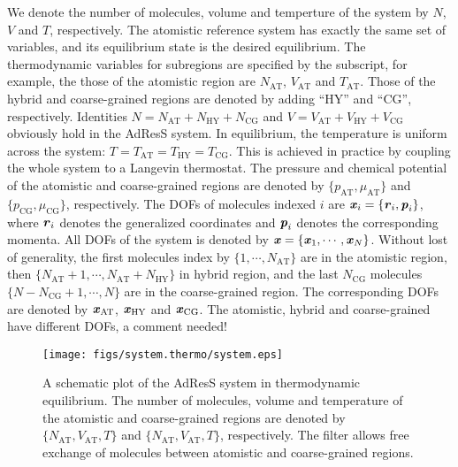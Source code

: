 \documentclass[epjST]{svjour}
\newcommand{\redc}[1]{{\color{red} #1}}
\newcommand{\vect}[1]{\textbf{\textit{#1}}}
\newcommand{\AT}[0]{\textrm{AT}}
\newcommand{\HY}[0]{\textrm{HY}}
\newcommand{\CG}[0]{\textrm{CG}}
\newcommand{\moleidxone}[0]{i}
\begin{document}
We denote the number of molecules, volume and temperture of the system by $N$, $V$ and $T$, respectively.
The atomistic reference system has exactly the same set of variables, and its equilibrium state  is
the desired equilibrium.
The thermodynamic variables for subregions are specified by the subscript,
for example, the those of the atomistic region are 
$N_\AT$, $V_\AT$ and $T_\AT$. Those of the hybrid and coarse-grained regions
are denoted by adding ``$\HY$'' and ``$\CG$'', respectively.
Identities $N = N_\AT + N_\HY + N_\CG$ and $V = V_\AT + V_\HY + V_\CG$ obviously hold
in the AdResS system.
In equilibrium, the temperature is uniform across the system: $T = T_\AT = T_\HY = T_\CG$.
This is achieved in practice by coupling the whole system to a Langevin thermostat.
The pressure and chemical potential of the atomistic and coarse-grained regions
are denoted by $\{p_\AT, \mu_\AT\}$
and $\{p_\CG, \mu_\CG\}$, respectively.
The DOFs of molecules indexed $\moleidxone$ are $\vect x_\moleidxone = \{\vect r_\moleidxone, \vect p_\moleidxone\}$, where
$\vect r_\moleidxone$ denotes the generalized coordinates and $\vect p_\moleidxone$ denotes the corresponding momenta.
All DOFs of the system is denoted by $\vect x = \{\vect x_1, \cdots, \vect x_N\}$. Without lost of
generality, the first molecules index by $\{1, \cdots, N_\AT\}$ are in the atomistic region, then $\{N_\AT+1, \cdots, N_\AT + N_\HY\}$ in hybrid region, and
the last $N_\CG$ molecules $\{N-N_\CG+1, \cdots, N\}$ are in the coarse-grained region. The corresponding DOFs are denoted by $\vect x_\AT$, $\vect x_\HY$ and $\vect x_\CG$.
\redc{The atomistic, hybrid and coarse-grained have different DOFs, a comment needed!}

\begin{figure}
  \centering
  \texttt{[image: figs/system.thermo/system.eps]}
  \caption{A schematic plot of the AdResS system in thermodynamic
    equilibrium. The number of molecules, volume and temperature of
    the atomistic and coarse-grained regions are denoted by $\{N_\AT,
    V_\AT, T\}$ and $\{N_\AT, V_\AT, T\}$, respectively. The filter
    allows free exchange of molecules between atomistic and
    coarse-grained regions.}
  \label{fig:system-thermo}
\end{figure}
\end{document}
